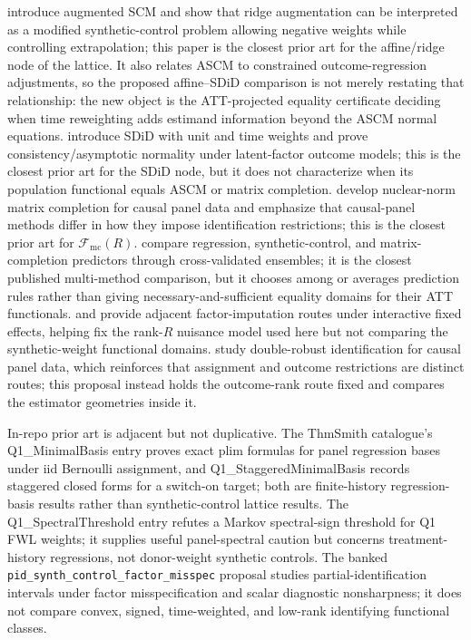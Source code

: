 \documentclass[11pt]{article}
\newcommand{\calF}{\mathcal{F}}
\theoremstyle{definition}
\theoremstyle{plain}
\theoremstyle{remark}
\begin{document}
\citet{BenMichaelFellerRothstein2021} introduce augmented SCM and show that ridge augmentation can be interpreted as a modified synthetic-control problem allowing negative weights while controlling extrapolation; this paper is the closest prior art for the affine/ridge node of the lattice. It also relates ASCM to constrained outcome-regression adjustments, so the proposed affine--SDiD comparison is not merely restating that relationship: the new object is the ATT-projected equality certificate deciding when time reweighting adds estimand information beyond the ASCM normal equations. \citet{ArkhangelskyAtheyHirshbergImbensWager2021} introduce SDiD with unit and time weights and prove consistency/asymptotic normality under latent-factor outcome models; this is the closest prior art for the SDiD node, but it does not characterize when its population functional equals ASCM or matrix completion. \citet{AtheyBayatiDoudchenkoImbensKhosravi2021} develop nuclear-norm matrix completion for causal panel data and emphasize that causal-panel methods differ in how they impose identification restrictions; this is the closest prior art for \(\calF_{\mathrm{mc}}(R)\). \citet{AtheyBayatiImbensQu2019} compare regression, synthetic-control, and matrix-completion predictors through cross-validated ensembles; it is the closest published multi-method comparison, but it chooses among or averages prediction rules rather than giving necessary-and-sufficient equality domains for their ATT functionals. \citet{Xu2017} and \citet{BaiNg2021} provide adjacent factor-imputation routes under interactive fixed effects, helping fix the rank-\(R\) nuisance model used here but not comparing the synthetic-weight functional domains. \citet{ArkhangelskyImbens2022} study double-robust identification for causal panel data, which reinforces that assignment and outcome restrictions are distinct routes; this proposal instead holds the outcome-rank route fixed and compares the estimator geometries inside it.

In-repo prior art is adjacent but not duplicative. The ThmSmith catalogue's Q1\_MinimalBasis entry proves exact plim formulas for panel regression bases under iid Bernoulli assignment, and Q1\_StaggeredMinimalBasis records staggered closed forms for a switch-on target; both are finite-history regression-basis results rather than synthetic-control lattice results. The Q1\_SpectralThreshold entry refutes a Markov spectral-sign threshold for Q1 FWL weights; it supplies useful panel-spectral caution but concerns treatment-history regressions, not donor-weight synthetic controls. The banked \texttt{pid\_synth\_control\_factor\_misspec} proposal studies partial-identification intervals under factor misspecification and scalar diagnostic nonsharpness; it does not compare convex, signed, time-weighted, and low-rank identifying functional classes.
\end{document}
